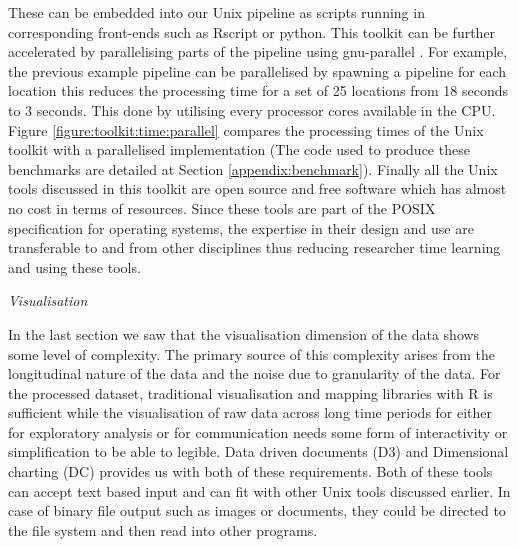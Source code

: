 These can be embedded into our Unix pipeline as scripts running in corresponding front-ends such as Rscript or python.
This toolkit can be further accelerated by parallelising parts of the pipeline using gnu-parallel \cite{tange2018parallel}.
For example, the previous example pipeline can be parallelised by spawning a pipeline for each location this reduces the processing time for a set of 25 locations from 18 seconds to 3 seconds.
This done by utilising every processor cores available in the CPU.
Figure \ref{figure:toolkit:time:parallel} compares the processing times of the Unix toolkit with a parallelised implementation (The code used to produce these benchmarks are detailed at Section \ref{appendix:benchmark}).
Finally all the Unix tools discussed in this toolkit are open source and free software which has almost no cost in terms of resources.
Since these tools are part of the POSIX specification \cite{walli1995posix} for operating systems, the expertise in their design and use are transferable to and from other disciplines thus reducing researcher time learning and using these tools.



\vspace{1.5em}\noindent\textit{Visualisation}\vspace{0.5em}

In the last section we saw that the visualisation dimension of the data shows some level of complexity.
The primary source of this complexity arises from the longitudinal nature of the data and the noise due to granularity of the data.
For the processed dataset, traditional visualisation and mapping libraries with R is sufficient while the visualisation of raw data across long time periods for either for exploratory analysis or for communication needs some form of interactivity or simplification to be able to legible.
Data driven documents (D3) \cite{stanford2011d3} and Dimensional charting (DC) provides us with both of these requirements.
Both of these tools can accept text based input and can fit with other Unix tools discussed earlier.
In case of binary file output such as images or documents, they could be directed to the file system and then read into other programs.


